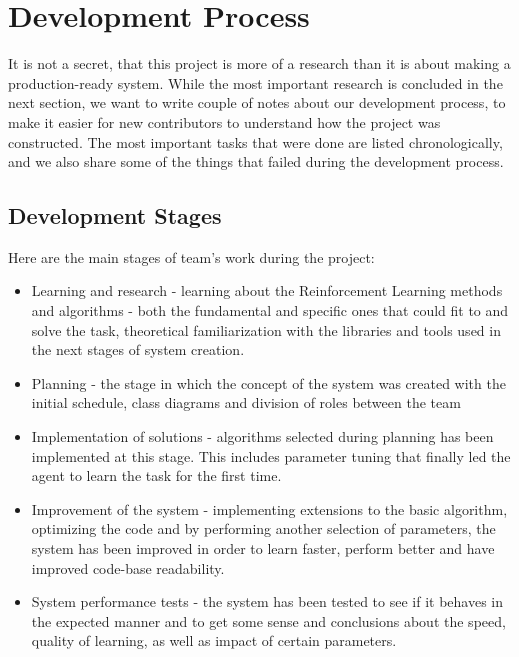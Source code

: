 \documentclass{article}
\begin{document}
\section{Development Process}
It is not a secret, that this project is more of a research than it is about making a production-ready system. While the most important research is concluded in the next section, we want to write couple of notes about our development process, to make it easier for new contributors to understand how the project was constructed. The most important tasks that were done are listed chronologically, and we also share some of the things that failed during the development process.
\subsection{Development Stages}
Here are the main stages of team's work during the project:
\begin{itemize}
\item Learning and research - learning about the Reinforcement Learning methods and algorithms - both the fundamental and specific ones that could fit to and solve the task, theoretical familiarization with the libraries and tools used in the next stages of system creation.
\item Planning - the stage in which the concept of the system was created with the initial schedule, class diagrams and division of roles between the team
\item Implementation of solutions - algorithms selected during planning has been implemented at this stage. This includes parameter tuning that finally led the agent to learn the task for the first time.
\item Improvement of the system - implementing extensions to the basic algorithm, optimizing the code and by performing another selection of parameters, the system has been improved in order to learn faster, perform better and have improved code-base readability.
\item System performance tests - the system has been tested to see if it behaves in the expected manner and to get some sense and conclusions about the speed, quality of learning, as well as impact of certain parameters.
\end{itemize}
\newpage
\end{document}

